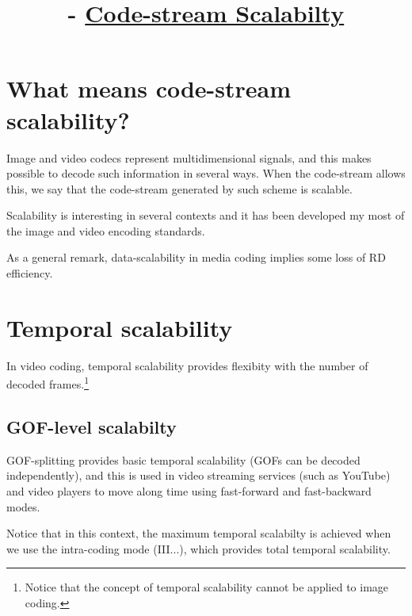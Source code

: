 


\title{\SM{} -  \href{https://github.com/Sistemas-Multimedia/Sistemas-Multimedia.github.io/tree/master/contents/data_scalability}{Code-stream Scalabilty}}

\maketitle
\tableofcontents

\section{What means code-stream scalability?}

Image and video codecs represent multidimensional signals, and this
makes possible to decode such information in several ways. When the
code-stream allows this, we say that the code-stream generated by such
scheme is scalable.

Scalability is interesting in several contexts and it has been
developed my most of the image and video encoding standards.

As a general remark, data-scalability in media coding implies some
loss of RD efficiency.


\section{Temporal scalability~\cite{vruiz__video_scalability}}


In video coding, temporal scalability provides flexibity with the
number of decoded frames.\footnote{Notice that the concept of temporal
scalability cannot be applied to image coding.}

\subsection{GOF-level scalabilty}
GOF-splitting provides basic temporal scalability (GOFs can be decoded
independently), and this is used in video streaming services (such as
YouTube) and video players to move along time using fast-forward and
fast-backward modes.
  
Notice that in this context, the maximum temporal scalabilty is
achieved when we use the intra-coding mode (III...), which provides
total temporal scalability.


